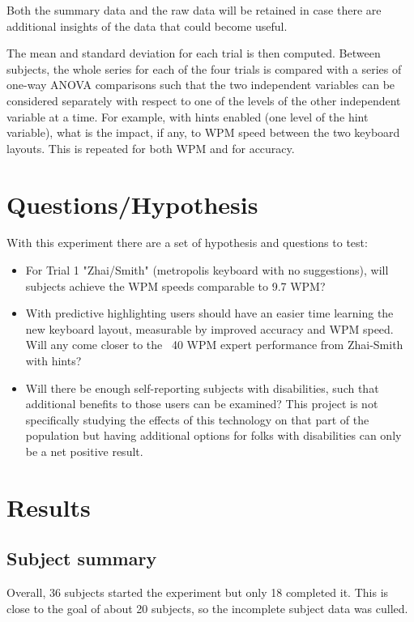 \documentclass[english]{vgtc}
\begin{document}
Both the summary data and the raw data will be retained in case there are additional 
insights of the data that could become useful.

The mean and standard deviation for each trial is then computed.  
Between subjects, the whole series for each of the four trials is compared
with a series of one-way ANOVA comparisons such that the two independent
variables can be considered separately with respect to one of the levels
of the other independent variable at a time.  For example, with hints enabled
(one level of the hint variable), what is the impact, if any, to WPM speed
between the two keyboard layouts.  This is repeated for both WPM and for
accuracy.

\section{Questions/Hypothesis}

With this experiment there are a set of hypothesis and questions to test:

\begin{itemize}
\item For Trial 1 "Zhai/Smith" (metropolis keyboard with no suggestions), will
subjects achieve the WPM speeds comparable to 9.7 WPM? 
\item With predictive highlighting users should have an easier time learning 
the new keyboard layout, measurable by improved accuracy and WPM speed.  Will any come closer to the ~40 WPM expert performance from Zhai-Smith with hints?
\item Will there be enough self-reporting subjects with disabilities,
such that additional benefits to those users can be examined?  This project is not 
specifically studying the effects of this technology on that part of the population 
but having additional options for folks with disabilities can only be a net positive result.
\end{itemize}

\section{Results}
\subsection{Subject summary}
Overall, 36 subjects started the experiment but only 18 completed it.  This is close to the
goal of about 20 subjects, so the incomplete subject data was culled.
\end{document}
